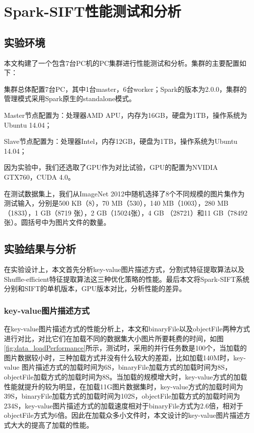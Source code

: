 ﻿\chapter{Spark-SIFT性能测试和分析}
\section{实验环境}
本文构建了一个包含7台PC机的PC集群进行性能测试和分析。集群的主要配置如下：
\begin{compactenum}
\item 集群总体配置7台PC，其中1台master，6台worker；Spark的版本为2.0.0，集群的管理模式采用Spark原生的standalone模式。
\item Master节点配置为：处理器AMD APU，内存为16GB，硬盘为1TB，操作系统为Ubuntu 14.04；
\item Slave节点配置为：处理器Intel，内存12GB，硬盘为1TB，操作系统为Ubuntu 14.04；
\end{compactenum}

因为实验中，我们还选取了GPU作为对比试验，GPU的配置为NVIDIA GTX760，CUDA 4.0。

在测试数据集上，我们从ImageNet 2012中随机选择了8个不同规模的图片集作为测试输入，分别是500 KB（8），70 MB（530），140 MB（1003），280 MB （1833），1 GB（8719 张），2 GB（15024张），4 GB （28721）和11 GB（78492张）。圆括号中为图片文件的数量。
\section{实验结果与分析}
在实验设计上，本文首先分析key-value图片描述方式，分割式特征提取算法以及Shuffle-efficient特征提取算法这三种优化策略的性能。最后本文将Spark-SIFT系统分别和SIFT的单机版本，GPU版本对比，分析性能的差异。
\subsection{key-value图片描述方式}
在key-value图片描述方式的性能分析上，本文和binaryFile以及objectFile两种方式进行对比，对比它们在加载不同的数据集大小图片所要耗费的时间，如图\ref{fig:data_loadPerformance}所示，测试时，采用的并行任务数是100个，当加载的图片数据较小时，三种加载方式并没有什么较大的差距，比如加载140M时，key-value 图片描述方式的加载时间为6S，binaryFile加载方式的加载时间为8S，objectFile加载方式的加载时间为8S。当加载的规模增大时，key-value方式的加载性能就提升的较为明显，在加载11G图片数据集时，key-value方式的加载时间为39S，binaryFile加载方式的加载时间为102S，objectFile加载方式的加载时间为234S，key-value图片描述方式的加载速度相对于binaryFile方式为2.6倍，相对于objectFile方式为6倍。因此在加载众多小文件时，本文设计的key-value图片描述方式大大的提高了加载的性能。

